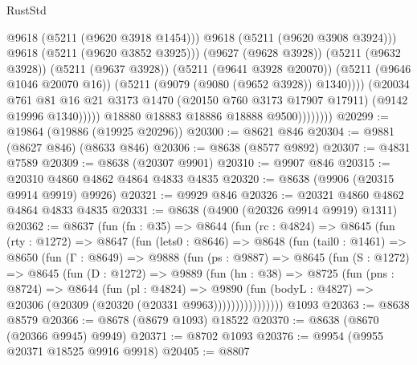 \begin{lexlean}{RustStd}
\begin{coremodule}
                                    @9618
                                    (@5211 (@9620 @3918 @1454)))
                                  @9618
                                  (@5211 (@9620 @3908 @3924)))
                                @9618
                                (@5211 (@9620 @3852 @3925)))
                              (@9627 (@9628 @3928))
                              (@5211 (@9632 @3928))
                              (@5211 (@9637 @3928))
                              (@5211 (@9641 @3928 @20070))
                              (@5211 (@9646 @1046 @20070 @16))
                              (@5211 (@9079 (@9080 (@9652 @3928)) @1340))))
                          (@20034
                            @761
                            @81
                            @16
                            @21
                            @3173
                            @1470
                            (@20150 @760 @3173 @17907 @17911)
                            (@9142 @19996 @1340)))))
                    @18880
                    @18883
                    @18886
                    @18888
                    @9500))))))))
@20299 := @19864 (@19886 (@19925 @20296))
@20300 := @8621 @846
@20304 := @9881 (@8627 @846) (@8633 @846)
@20306 := @8638 (@8577 @9892)
@20307 := @4831 @7589
@20309 := @8638 (@20307 @9901)
@20310 := @9907 @846
@20315 := @20310 @4860 @4862 @4864 @4833 @4835
@20320 := @8638 (@9906 (@20315 @9914 @9919) @9926)
@20321 := @9929 @846
@20326 := @20321 @4860 @4862 @4864 @4833 @4835
@20331 := @8638 (@4900 (@20326 @9914 @9919) @1311)
@20362 := @8637
    (fun (fn : @35) =>
    @8644
      (fun (rc : @4824) =>
      @8645
        (fun (rty : @1272) =>
        @8647
          (fun (lets0 : @8646) =>
          @8648
            (fun (tail0 : @1461) =>
            @8650
              (fun (Γ : @8649) =>
              @9888
                (fun (ps : @9887) =>
                @8645
                  (fun (S : @1272) =>
                  @8645
                    (fun (D : @1272) =>
                    @9889
                      (fun (hn : @38) =>
                      @8725
                        (fun (pns : @8724) =>
                        @8644
                          (fun (pl : @4824) =>
                          @9890
                            (fun (bodyL : @4827) =>
                            @20306 (@20309 (@20320 (@20331 @9963))))))))))))))))
    @1093
@20363 := @8638 @8579
@20366 := @8678 (@8679 @1093) @18522
@20370 := @8638 (@8670 (@20366 @9945) @9949)
@20371 := @8702 @1093
@20376 := @9954 (@9955 @20371 @18525 @9916 @9918)
@20405 := @8807

\end{coremodule}
\end{lexlean}
